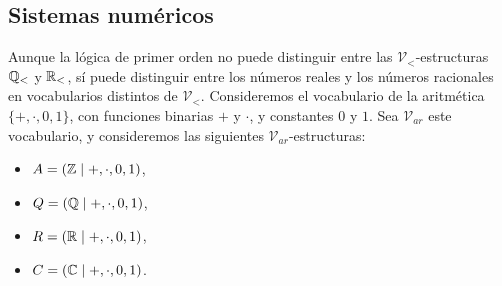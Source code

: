 \documentclass[12pt,a4paper]{book}
\newcommand{\VV}{\mathcal{V}}
\begin{document}
    \subsection{Sistemas numéricos}

    Aunque la lógica de primer orden no puede distinguir entre las $\VV_{<}$-estructuras $\mathbb{Q}_{<}$ y $\mathbb{R}_{<}$, sí puede
    distinguir entre los números reales y los números racionales en vocabularios distintos de $\VV_{<}$. Consideremos el
    vocabulario de la aritmética $\{+,\cdot,0,1\}$, con funciones binarias $+$ y $\cdot$, y constantes $0$ y $1$. Sea
    $\VV_{ar}$ este vocabulario, y consideremos las siguientes $\VV_{ar}$-estructuras:

    \begin{itemize}
        \item[$\bullet$] $A=(\mathbb{Z}\mid+,\cdot,0,1)$,
        \item[$\bullet$] $Q=(\mathbb{Q}\mid+,\cdot,0,1)$,
        \item[$\bullet$] $R=(\mathbb{R}\mid+,\cdot,0,1)$,
        \item[$\bullet$] $C=(\mathbb{C}\mid+,\cdot,0,1)$.
    \end{itemize}
\end{document}
